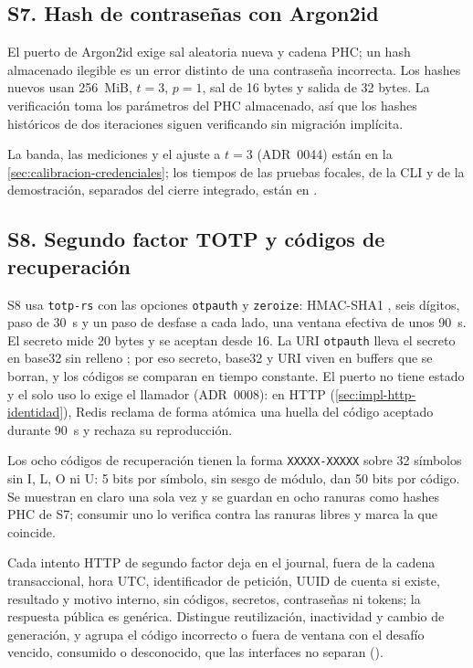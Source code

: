 \subsection{S7. Hash de contraseñas con Argon2id}\label{sec:impl-s7-argon2}

El puerto de Argon2id \cite{biryukov2021} exige sal aleatoria nueva y cadena PHC; un hash almacenado ilegible es un error distinto de una contraseña incorrecta. Los hashes nuevos usan 256~MiB, $t=3$, $p=1$, sal de 16 bytes y salida de 32 bytes. La verificación toma los parámetros del PHC almacenado, así que los hashes históricos de dos iteraciones siguen verificando sin migración implícita.

La banda, las mediciones y el ajuste a $t=3$ (ADR~0044) están en la \cref{sec:calibracion-credenciales}; los tiempos de las pruebas focales, de la CLI y de la demostración, separados del cierre integrado, están en .

\subsection{S8. Segundo factor TOTP y códigos de recuperación}\label{sec:impl-s8-totp}

S8 usa \texttt{totp-rs} con las opciones \texttt{otpauth} y \texttt{zeroize}: HMAC-SHA1 \cite{mraihi2011}, seis dígitos, paso de 30~s y un paso de desfase a cada lado, una ventana efectiva de unos 90~s. El secreto mide 20 bytes \cite{mraihi2005} y se aceptan desde 16. La URI \texttt{otpauth} lleva el secreto en base32 sin relleno \cite{josefsson2006}; por eso secreto, base32 y URI viven en buffers que se borran, y los códigos se comparan en tiempo constante. El puerto no tiene estado y el solo uso lo exige el llamador (ADR~0008): en HTTP (\cref{sec:impl-http-identidad}), Redis reclama de forma atómica una huella del código aceptado durante 90~s y rechaza su reproducción.

Los ocho códigos de recuperación tienen la forma \texttt{XXXXX-XXXXX} sobre 32 símbolos sin I, L, O ni U: 5 bits por símbolo, sin sesgo de módulo, dan 50 bits por código. Se muestran en claro una sola vez y se guardan en ocho ranuras como hashes PHC de S7; consumir uno lo verifica contra las ranuras libres y marca la que coincide.

Cada intento HTTP de segundo factor deja en el journal, fuera de la cadena transaccional, hora UTC, identificador de petición, UUID de cuenta si existe, resultado y motivo interno, sin códigos, secretos, contraseñas ni tokens; la respuesta pública es genérica. Distingue reutilización, inactividad y cambio de generación, y agrupa el código incorrecto o fuera de ventana con el desafío vencido, consumido o desconocido, que las interfaces no separan ().

